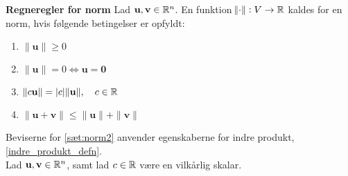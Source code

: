 \begin{thmx}\textbf{Regneregler for norm}\label{sæt:norm2} %
\newline
Lad $\mathbf{u}, \mathbf{v} \in \mathbb{R}^n$. En funktion $\norm{\cdot}: V \to \mathbb{R}$ kaldes for en norm, hvis følgende betingelser er opfyldt:
\begin{enumerate}
    \item $\|\mathbf{u}\|\geq 0$
    \item $\|\mathbf{u}\|=0 \Leftrightarrow \mathbf{u=0}$
    \item $\|c\mathbf{u}\|=|c| \|\mathbf{u}\|, \quad c\in \mathbb{R}$
    \item $\|\mathbf{u}+\mathbf{v}\|\leq \|\mathbf{u}\|+\|\mathbf{v}\|$
\end{enumerate}
\end{thmx}
%
\begin{bev} \textbf{} %
\newline
Beviserne for \autoref{sæt:norm2} anvender egenskaberne for indre produkt, \autoref{indre_produkt_defn}.\\
Lad $\mathbf{u}, \mathbf{v} \in \mathbb{R}^n$, samt lad $c\in \mathbb{R}$ være en vilkårlig skalar.


\end{bev}
